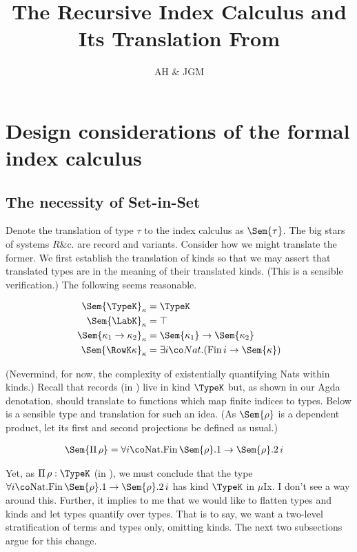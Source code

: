 \documentclass[12pt]{article}
\title{The Recursive Index Calculus and Its Translation From \RO}
\author{AH \& JGM}
\newcommand\Nat{\mathrm{Nat}}
\newcommand\Fin{\mathrm{Fin}}
\newcommand\MuIx{\ensuremath{\mu}Ix}
\begin{document}
\maketitle

\section{Design considerations of the formal index calculus}

\subsection{The necessity of Set-in-Set}

Denote the translation of \RO type $\tau$ to the index calculus as $\Sem{\tau}$. The big stars of systems $R$\&c. are record and variants. Consider how we might translate the former. We first establish the translation of kinds so that we may assert that translated types are in the meaning of their translated kinds. (This is a sensible verification.) The following seems reasonable.

\begin{align*}
  \Sem{\TypeK}_\kappa &= \TypeK \\
  \Sem{\LabK}_\kappa &= \top \\
  \Sem{\kappa_1 \to \kappa_2}_\kappa &= \Sem{\kappa_1} \to \Sem{\kappa_2} \\
  \Sem{\RowK \kappa}_\kappa &= \exists i \co Nat. (\Fin \, i \to \Sem{\kappa}) \\
\end{align*}

(Nevermind, for now, the complexity of existentially quantifying Nats within kinds.) Recall that records (in \RO) live in kind $\TypeK$ but, as shown in our Agda denotation, should translate to functions which map finite indices to types. Below is a sensible type and translation for such an idea. (As $\Sem{\rho}$ is a dependent product, let its first and second projections be defined as usual.)

\begin{align*}
  \Sem{\Pi \, \rho} &= \forall i \co \Nat. \Fin \, \Sem{\rho}.1 \to \Sem{\rho}.2 \, i
\end{align*}

Yet, as $\Pi \, \rho : \TypeK$ (in \RO), we must conclude that the type $\forall i \co \Nat. \Fin \, \Sem{\rho}.1 \to \Sem{\rho}.2 \, i$ has kind $\TypeK$ in \MuIx. I don't see a way around this. Further, it implies to me that we would like to flatten types and kinds and let types quantify over types. That is to say, we want a two-level stratification of terms and types only, omitting kinds. The next two subsections argue for this change.
\end{document}
